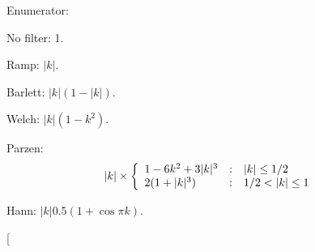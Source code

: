 \begin{Desc}
\item[Enumerator: ]\par
\begin{description}
\item[{\em 
\hypertarget{classFilter_aa61599baec09f1011f80edc1e9118728ae19fe54a915de079e6abc4d9b0e14b94}{
NONE}
\label{classFilter_aa61599baec09f1011f80edc1e9118728ae19fe54a915de079e6abc4d9b0e14b94}
}]No filter: 1. \item[{\em 
\hypertarget{classFilter_aa61599baec09f1011f80edc1e9118728a4bdd387e7ead67fd82d768908ad67184}{
RAMP}
\label{classFilter_aa61599baec09f1011f80edc1e9118728a4bdd387e7ead67fd82d768908ad67184}
}]Ramp: $ |k| $. \item[{\em 
\hypertarget{classFilter_aa61599baec09f1011f80edc1e9118728a26a5c04c5f8a3c3f002dc8e6ec7fb4d0}{
BARLETT}
\label{classFilter_aa61599baec09f1011f80edc1e9118728a26a5c04c5f8a3c3f002dc8e6ec7fb4d0}
}]Barlett: $ |k|(1-|k|) $. \item[{\em 
\hypertarget{classFilter_aa61599baec09f1011f80edc1e9118728afa286e60366f6a9db4fddacffcbe11d7}{
WELCH}
\label{classFilter_aa61599baec09f1011f80edc1e9118728afa286e60366f6a9db4fddacffcbe11d7}
}]Welch: $ |k|(1-k^2) $. \item[{\em 
\hypertarget{classFilter_aa61599baec09f1011f80edc1e9118728a3fad77b240a2e8d821f010d773013ec8}{
PARZEN}
\label{classFilter_aa61599baec09f1011f80edc1e9118728a3fad77b240a2e8d821f010d773013ec8}
}]Parzen: \[ |k|\times\left\{ \begin{array}{lll} 1-6k^2+3|k|^3 & : & |k|\leq1/2 \cr 2(1+|k|^3) & : & 1/2<|k|\leq1 \end{array} \right. \] \item[{\em 
\hypertarget{classFilter_aa61599baec09f1011f80edc1e9118728a164fdb296a5ec4fc0b570330ebac3a08}{
HANN}
\label{classFilter_aa61599baec09f1011f80edc1e9118728a164fdb296a5ec4fc0b570330ebac3a08}
}]Hann: $ |k|0.5(1+\cos{\pi k}) $. \item[{\em 
\hypertarget{classFilter_aa61599baec09f1011f80edc1e9118728a9e2c221e0d6439d1d9c49b8b8e855524}{
}}
\end{description}
\end{Desc}

